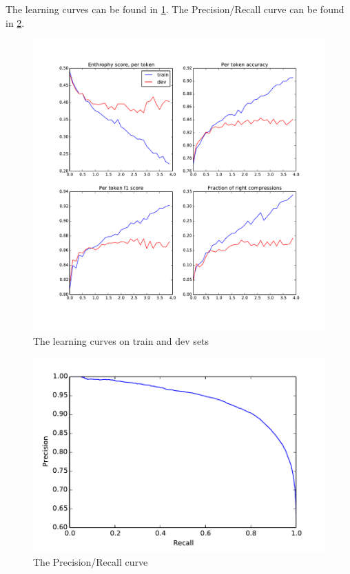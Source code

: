 \documentclass[a4paper,12pt,oneside]{article}
\begin{document}
The learning curves can be found in \cref{fig:lcur}. The Precision/Recall curve can be found in \cref{fig:pr}.

\begin{figure}[t]%
	\centering
	\includegraphics[width=\columnwidth]{learning_curves}
	\caption{The learning curves on train and dev sets}%
	\label{fig:lcur}%
\end{figure}


\begin{figure}[t]%
	\centering
	\includegraphics[width=\columnwidth]{precision_recal_curve}
	\caption{The Precision/Recall curve}%
	\label{fig:pr}%
\end{figure}
\end{document}
